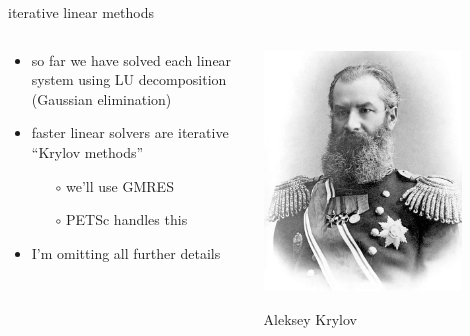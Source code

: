 \documentclass[10pt,hyperref,dvipsnames]{beamer}
\begin{document}
\begin{frame}{iterative linear methods}

\begin{columns}
\begin{column}{0.75\textwidth}
\begin{itemize}
\item so far we have solved each linear system using LU decomposition (Gaussian elimination)
\item faster linear solvers are iterative ``Krylov methods''
    \begin{itemize}
    \item[$\circ$] we'll use GMRES
    \item[$\circ$] PETSc handles this
    \end{itemize}
\item I'm omitting all further details
\end{itemize}
\end{column}
\begin{column}{0.25\textwidth}
\hfill \includegraphics[width=0.8\textwidth]{figs/people/akrylov.jpg}

\hfill {\tiny Aleksey Krylov}
\end{column}
\end{columns}
\end{frame}
\end{document}
